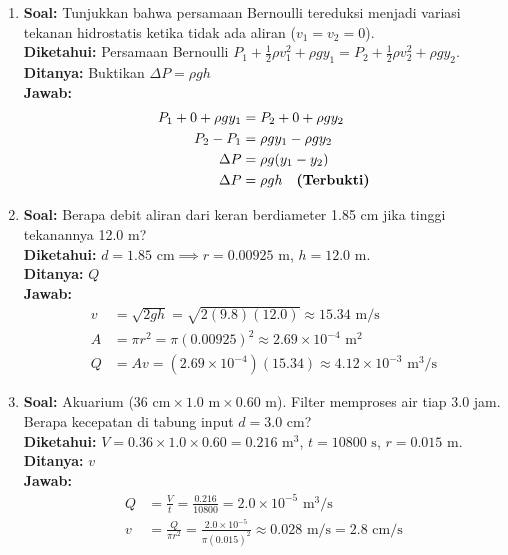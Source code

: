 \documentclass[twocolumn]{article}
\begin{document}
\begin{enumerate}
    \item \textbf{Soal:} Tunjukkan bahwa persamaan Bernoulli tereduksi menjadi variasi tekanan hidrostatis ketika tidak ada aliran ($v_1 = v_2 = 0$). \\
    \textbf{Diketahui:} Persamaan Bernoulli $P_1 + \frac{1}{2}\rho v_1^2 + \rho g y_1 = P_2 + \frac{1}{2}\rho v_2^2 + \rho g y_2$. \\
    \textbf{Ditanya:} Buktikan $\Delta P = \rho g h$ \\
    \textbf{Jawab:}
    \begin{align*}
        P_1 + 0 + \rho g y_1 &= P_2 + 0 + \rho g y_2 \\
        P_2 - P_1 &= \rho g y_1 - \rho g y_2 \\
        \Delta P &= \rho g (y_1 - y_2) \\
        \Delta P &= \rho g h \quad \text{\textbf{(Terbukti)}}
    \end{align*}

    \item \textbf{Soal:} Berapa debit aliran dari keran berdiameter 1.85 cm jika tinggi tekanannya 12.0 m? \\
    \textbf{Diketahui:} $d = 1.85 \text{ cm} \implies r = 0.00925 \text{ m}$, $h = 12.0 \text{ m}$. \\
    \textbf{Ditanya:} $Q$ \\
    \textbf{Jawab:}
    \begin{align*}
        v &= \sqrt{2gh} = \sqrt{2(9.8)(12.0)} \approx 15.34 \text{ m/s} \\
        A &= \pi r^2 = \pi (0.00925)^2 \approx 2.69 \times 10^{-4} \text{ m}^2 \\
        Q &= A v = (2.69 \times 10^{-4})(15.34) \approx 4.12 \times 10^{-3} \text{ m}^3/\text{s}
    \end{align*}

    \item \textbf{Soal:} Akuarium ($36 \text{ cm} \times 1.0 \text{ m} \times 0.60 \text{ m}$). Filter memproses air tiap 3.0 jam. Berapa kecepatan di tabung input $d = 3.0 \text{ cm}$? \\
    \textbf{Diketahui:} $V = 0.36 \times 1.0 \times 0.60 = 0.216 \text{ m}^3$, $t = 10800 \text{ s}$, $r = 0.015 \text{ m}$. \\
    \textbf{Ditanya:} $v$ \\
    \textbf{Jawab:}
    \begin{align*}
        Q &= \frac{V}{t} = \frac{0.216}{10800} = 2.0 \times 10^{-5} \text{ m}^3/\text{s} \\
        v &= \frac{Q}{\pi r^2} = \frac{2.0 \times 10^{-5}}{\pi (0.015)^2} \approx 0.028 \text{ m/s} = 2.8 \text{ cm/s}
    \end{align*}


\end{enumerate}
\end{document}
